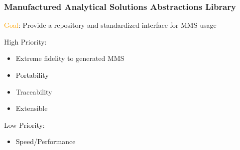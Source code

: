 \documentclass[mathserif]{beamer}
\begin{document}
\begin{frame}
  \frametitle{Manufactured Analytical Solutions Abstractions Library}

  \textcolor{orange}{Goal}: Provide a repository and standardized interface for MMS usage

  \begin{block}{High Priority:}  
    \begin{itemize}
    \item Extreme fidelity to generated MMS
    \item Portability
    \item Traceability
    \item Extensible
    \end{itemize}
  \end{block}

  \begin{block}{Low Priority:}  
    \begin{itemize}
    \item Speed/Performance
    \end{itemize}
  \end{block}

\end{frame}
\end{document}
